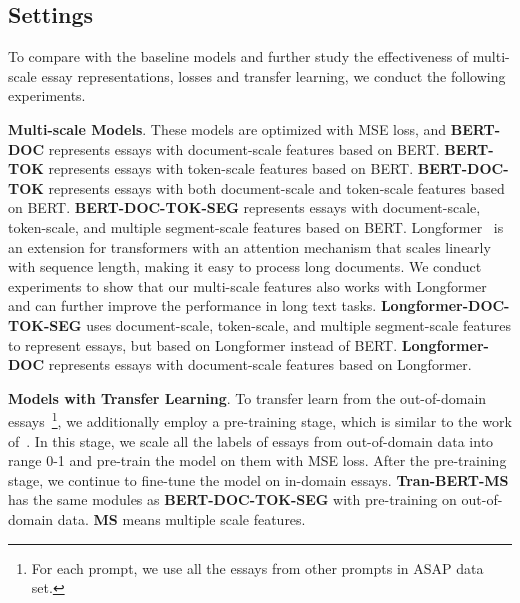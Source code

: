\documentclass[11pt]{article}
\begin{document}
\subsection{Settings}
To compare with the baseline models and further study the effectiveness of multi-scale essay representations, losses and transfer learning, we conduct the following experiments. 


\textbf{Multi-scale Models}. These models are optimized with MSE loss, and 
\textbf{BERT-DOC} represents essays with document-scale features based on BERT.
\textbf{BERT-TOK} represents essays with token-scale features based on BERT.
\textbf{BERT-DOC-TOK} represents essays with both document-scale and token-scale features based on BERT.
\textbf{BERT-DOC-TOK-SEG} represents essays with document-scale, token-scale, and multiple segment-scale features based on BERT.
Longformer~\citep{Beltagy2020} is an extension for transformers with an attention mechanism that scales linearly with sequence length, making it easy to process long documents.
We conduct experiments to show that our multi-scale features also works with Longformer and can further improve the performance in long text tasks.
\textbf{Longformer-DOC-TOK-SEG} uses document-scale, token-scale, and multiple segment-scale features to represent essays, but based on Longformer instead of BERT.
\textbf{Longformer-DOC} represents essays with document-scale features based on Longformer. 

\textbf{Models with Transfer Learning}.
To transfer learn from the out-of-domain essays~\footnote{For each prompt, we use all the essays from other prompts in ASAP data set.}, we additionally employ a pre-training stage, which is similar to the work of~\citep{Song:2020}.
In this stage, we scale all the labels of essays from out-of-domain data into range 0-1 and pre-train the model on them with MSE loss.
After the pre-training stage, we continue to fine-tune the model on in-domain essays.
\textbf{Tran-BERT-MS} has the same modules as \textbf{BERT-DOC-TOK-SEG} with pre-training on out-of-domain data.
\textbf{MS} means multiple scale features.
\end{document}
